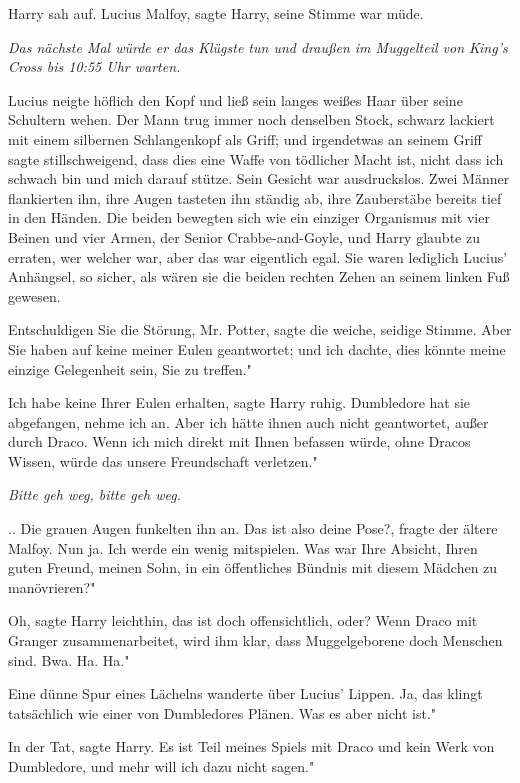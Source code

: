 Harry sah auf. \glqq Lucius Malfoy\grqq{}, sagte Harry, seine Stimme war müde.

\emph{Das nächste Mal würde er das Klügste tun und draußen im Muggelteil von
King's Cross bis 10:55 Uhr warten.}

Lucius neigte höflich den Kopf und ließ sein langes weißes Haar über seine
Schultern wehen. Der Mann trug immer noch denselben Stock, schwarz lackiert mit
einem silbernen Schlangenkopf als Griff; und irgendetwas an seinem Griff sagte
stillschweigend, dass dies eine Waffe von tödlicher Macht ist, nicht dass ich
schwach bin und mich darauf stütze. Sein Gesicht war ausdruckslos. Zwei Männer
flankierten ihn, ihre Augen tasteten ihn ständig ab, ihre Zauberstäbe bereits
tief in den Händen. Die beiden bewegten sich wie ein einziger Organismus mit
vier Beinen und vier Armen, der Senior Crabbe-and-Goyle, und Harry glaubte zu
erraten, wer welcher war, aber das war eigentlich egal. Sie waren lediglich
Lucius' Anhängsel, so sicher, als wären sie die beiden rechten Zehen an seinem
linken Fuß gewesen.

\glqq Entschuldigen Sie die Störung, Mr. Potter\grqq{}, sagte die weiche,
seidige Stimme. \glqq Aber Sie haben auf keine meiner Eulen geantwortet; und ich
dachte, dies könnte meine einzige Gelegenheit sein, Sie zu treffen."

\glqq Ich habe keine Ihrer Eulen erhalten\grqq{}, sagte Harry ruhig. \glqq
Dumbledore hat sie abgefangen, nehme ich an. Aber ich hätte ihnen auch nicht
geantwortet, außer durch Draco. Wenn ich mich direkt mit Ihnen befassen würde,
ohne Dracos Wissen, würde das unsere Freundschaft verletzen."

\emph{Bitte geh weg, bitte geh weg.}

.. Die grauen Augen funkelten ihn an. \glqq Das ist also deine Pose?\grqq{},
fragte der ältere Malfoy. \glqq Nun ja. Ich werde ein wenig mitspielen. Was war
Ihre Absicht, Ihren guten Freund, meinen Sohn, in ein öffentliches Bündnis mit
diesem Mädchen zu manövrieren?"

\glqq Oh\grqq{}, sagte Harry leichthin, \glqq das ist doch offensichtlich, oder?
Wenn Draco mit Granger zusammenarbeitet, wird ihm klar, dass Muggelgeborene doch
Menschen sind. Bwa. Ha. Ha."

Eine dünne Spur eines Lächelns wanderte über Lucius' Lippen. \glqq Ja, das
klingt tatsächlich wie einer von Dumbledores Plänen. Was es aber nicht ist."

\glqq In der Tat\grqq{}, sagte Harry. \glqq Es ist Teil meines Spiels mit Draco
und kein Werk von Dumbledore, und mehr will ich dazu nicht sagen."

